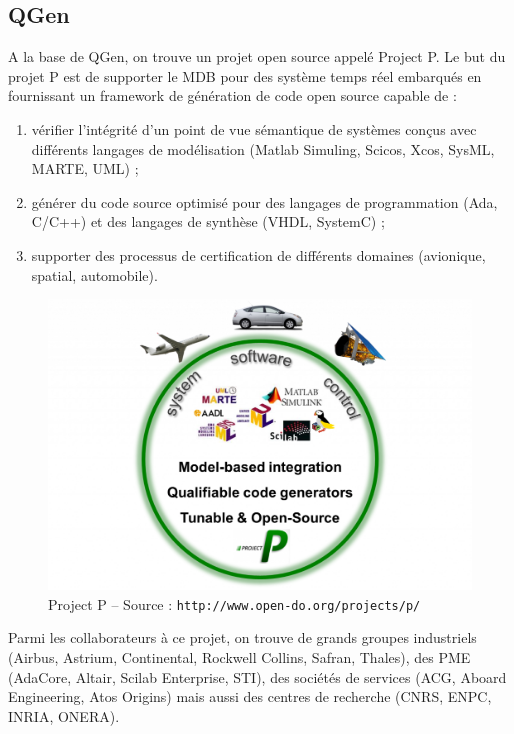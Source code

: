 \subsection{QGen}
A la base de QGen, on trouve un projet open source appelé
Project P. Le but du projet P est de supporter le MDB pour des
système temps réel embarqués en fournissant un framework de génération de code
open source capable de :
\begin{enumerate}
  \item vérifier l'intégrité d'un point de vue sémantique de systèmes conçus avec
	différents langages de modélisation (Matlab\up{\circledR}
	Simuling\up{\circledR}, Scicos, Xcos, SysML, MARTE, UML) ;
  \item générer du code source optimisé pour des langages de programmation
	(Ada, C/C++) et des langages de synthèse (VHDL, SystemC) ;
  \item supporter des processus de certification de différents domaines
	(avionique, spatial, automobile).
\end{enumerate}

\begin{figure}[h]
  \centering
  \includegraphics[scale=0.3]{images/projectp}
  \caption{Project P -- Source : {\tt http://www.open-do.org/projects/p/}}
  \label{fig:projectp}
\end{figure}

Parmi les collaborateurs à ce projet, on trouve de grands groupes industriels
(Airbus, Astrium, Continental, Rockwell Collins, Safran, Thales), des PME
(AdaCore, Altair, Scilab Enterprise, STI), des sociétés de services (ACG, Aboard
Engineering, Atos Origins) mais aussi des centres de recherche (CNRS, ENPC,
INRIA, ONERA).\\

